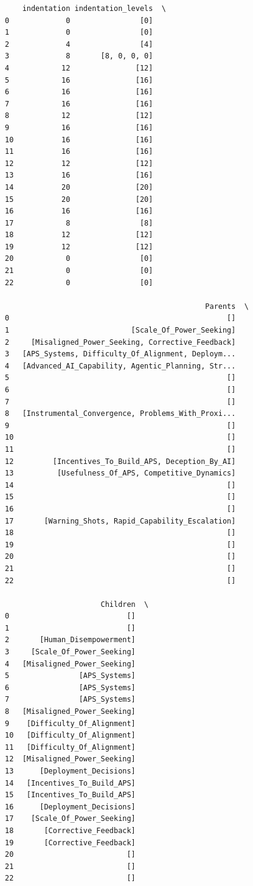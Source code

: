 \documentclass[
  11pt,
  letterpaper,
]{book}
\begin{document}
\begin{verbatim}
    indentation indentation_levels  \
0             0                [0]   
1             0                [0]   
2             4                [4]   
3             8       [8, 0, 0, 0]   
4            12               [12]   
5            16               [16]   
6            16               [16]   
7            16               [16]   
8            12               [12]   
9            16               [16]   
10           16               [16]   
11           16               [16]   
12           12               [12]   
13           16               [16]   
14           20               [20]   
15           20               [20]   
16           16               [16]   
17            8                [8]   
18           12               [12]   
19           12               [12]   
20            0                [0]   
21            0                [0]   
22            0                [0]   

                                              Parents  \
0                                                  []   
1                            [Scale_Of_Power_Seeking]   
2     [Misaligned_Power_Seeking, Corrective_Feedback]   
3   [APS_Systems, Difficulty_Of_Alignment, Deploym...   
4   [Advanced_AI_Capability, Agentic_Planning, Str...   
5                                                  []   
6                                                  []   
7                                                  []   
8   [Instrumental_Convergence, Problems_With_Proxi...   
9                                                  []   
10                                                 []   
11                                                 []   
12         [Incentives_To_Build_APS, Deception_By_AI]   
13          [Usefulness_Of_APS, Competitive_Dynamics]   
14                                                 []   
15                                                 []   
16                                                 []   
17       [Warning_Shots, Rapid_Capability_Escalation]   
18                                                 []   
19                                                 []   
20                                                 []   
21                                                 []   
22                                                 []   

                      Children  \
0                           []   
1                           []   
2       [Human_Disempowerment]   
3     [Scale_Of_Power_Seeking]   
4   [Misaligned_Power_Seeking]   
5                [APS_Systems]   
6                [APS_Systems]   
7                [APS_Systems]   
8   [Misaligned_Power_Seeking]   
9    [Difficulty_Of_Alignment]   
10   [Difficulty_Of_Alignment]   
11   [Difficulty_Of_Alignment]   
12  [Misaligned_Power_Seeking]   
13      [Deployment_Decisions]   
14   [Incentives_To_Build_APS]   
15   [Incentives_To_Build_APS]   
16      [Deployment_Decisions]   
17    [Scale_Of_Power_Seeking]   
18       [Corrective_Feedback]   
19       [Corrective_Feedback]   
20                          []   
21                          []   
22                          []   


\end{verbatim}
\end{document}
